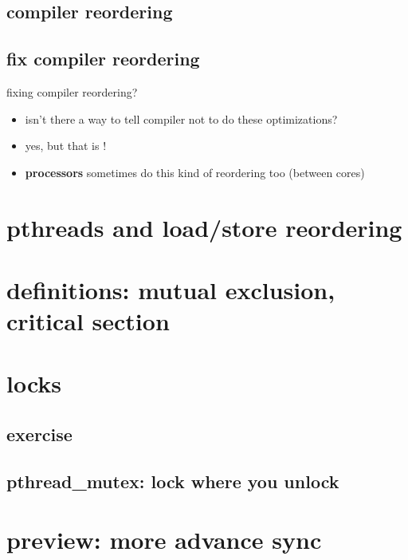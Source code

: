 \subsection{compiler reordering}


\subsection{fix compiler reordering}
\begin{frame}{fixing compiler reordering?}
    \begin{itemize}
    \item isn't there a way to tell compiler not to do these optimizations?
    \item yes, but that is !
    \item \textbf{processors} sometimes do this kind of reordering too (between cores)
    \end{itemize}
\end{frame}

\section{pthreads and load/store reordering}


\section{definitions: mutual exclusion, critical section}


\section{locks}




\subsection{exercise}


\subsection{pthread\_mutex: lock where you unlock}


\section{preview: more advance sync}


